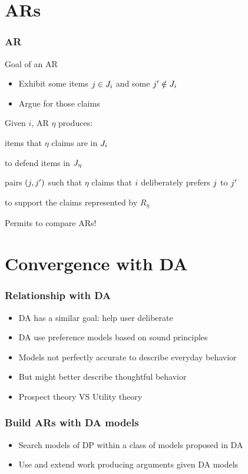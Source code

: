 \documentclass[french,english]{beamer}
\begin{document}
\section{\aclp{AR}}
\begin{frame}
	\frametitle{\acl{AR}}
	\begin{block}{Goal of an \ac{AR}}
		\begin{itemize}
			\item Exhibit some items $j \in J_i$ and some $j' \notin J_i$
			\item Argue for those claims
		\end{itemize}
	\end{block}
	Given $i$, \ac{AR} $\eta$ produces:
	\begin{description}
		\item[$\mitems \subseteq \allitems$] items that $\eta$ claims are in $J_i$
		\item[$\mdef: \mitems × \allitems → \allargs$] to defend items in $J_{\eta}$
		\item[$R_\eta \subseteq \allitems × \allitems$] pairs $(j, j')$ such that $\eta$ claims that $i$ deliberately prefers $j$ to $j'$
		\item[$\matt: R_\eta → \allargs$] to support the claims represented by $R_\eta$
	\end{description}
	Permits to compare ARs!
\end{frame}

\section{Convergence with \acl{DA}}
\begin{frame}
	\frametitle{Relationship with \acl{DA}}
	\begin{itemize}
		\item \ac{DA} has a similar goal: help user deliberate
		\item DA use preference models based on sound principles
		\item Models not perfectly accurate to describe everyday behavior
		\item But might better describe thoughtful behavior
		\item Prospect theory \citep{wakker_prospect_2010} VS Utility theory
	\end{itemize}
\end{frame}

\begin{frame}
	\frametitle{Build \aclp{AR} with \acl{DA} models}
	\begin{itemize}
		\item Search models of \ac{DP} within a class of models proposed in \ac{DA}
		\item Use and extend work producing arguments given \ac{DA} models
	\end{itemize}
\end{frame}
\end{document}
